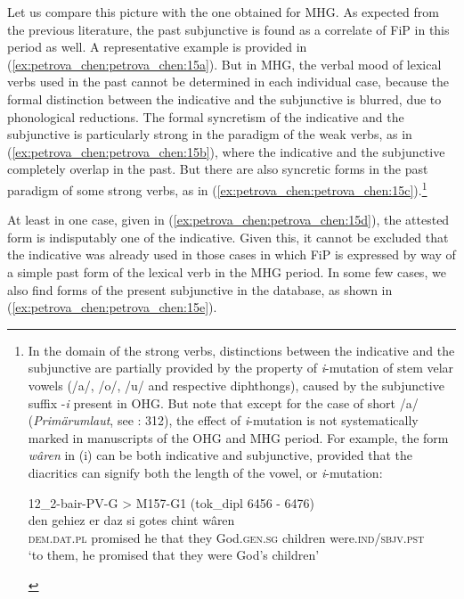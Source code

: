 \documentclass[output=paper,colorlinks,citecolor=brown]{langscibook}
\begin{document}
Let us compare this picture with the one obtained for MHG. As expected from the previous literature, the past subjunctive is found as a correlate of FiP in this period as well. A representative example is provided in (\ref{ex:petrova_chen:petrova_chen:15a}). But in MHG, the verbal mood of lexical verbs used in the past cannot be determined in each individual case, because the formal distinction between the indicative and the subjunctive is blurred, due to phonological reductions. The formal syncretism of the indicative and the subjunctive is particularly strong in the paradigm of the weak verbs, as in (\ref{ex:petrova_chen:petrova_chen:15b}), where the indicative and the subjunctive completely overlap in the past. But there are also syncretic forms in the past paradigm of some strong verbs, as in (\ref{ex:petrova_chen:petrova_chen:15c}).\footnote{In the domain of the strong verbs, distinctions between the indicative and the subjunctive are partially provided by the property of \textit{i}-mutation of stem velar vowels (/a/, /o/, /u/ and respective diphthongs), caused by the subjunctive suffix -\textit{i} present in OHG. But note that except for the case of short /a/ (\textit{Primärumlaut}, see \cite{Sonderegger1979}: 312), the effect of \textit{i}-mutation is not systematically marked in manuscripts of the OHG and MHG period. For example, the form \textit{wâren} in (i) can be both indicative and subjunctive, provided that the diacritics can signify both the length of the vowel, or \textit{i}-mutation:

\begin{exe}
    12\_2-bair-PV-G > M157-G1 (tok\_dipl 6456 - 6476) \\
    \gll den gehiez er daz si gotes chint wâren\\
    \textsc{dem.dat.pl} promised he that they God.\textsc{gen.sg} children were.\textsc{ind/sbjv.pst}\\
    \glt ‘to them, he promised that they were God’s children’
\end{exe}

}

At least in one case, given in (\ref{ex:petrova_chen:petrova_chen:15d}), the attested form is indisputably one of the indicative. Given this, it cannot be excluded that the indicative was already used in those cases in which FiP is expressed by way of a simple past form of the lexical verb in the MHG period. In some few cases, we also find forms of the present subjunctive in the database, as shown in (\ref{ex:petrova_chen:petrova_chen:15e}).
\end{document}

